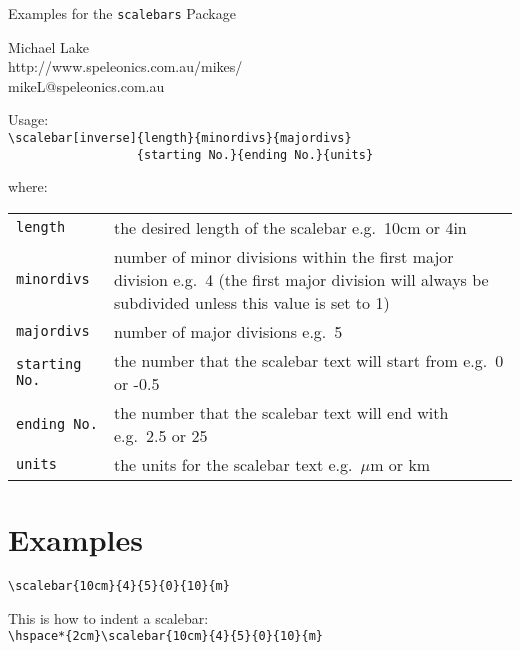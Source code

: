 \documentclass[a4paper,12pt]{article}
\begin{document}
\thispagestyle{empty}

\setlength{\parindent}{0pt}
\setlength{\parskip}{0.4\baselineskip}

{\huge \centering Examples for the \texttt{scalebars} Package

}
\vspace{2\baselineskip}

{\raggedleft Michael Lake\\
\small http://www.speleonics.com.au/mikes/\\
\makeatletter mikeL@speleonics.com.au \makeatother

}
\vspace{2\baselineskip}

Usage:\\
\verb+\scalebar[inverse]{length}{minordivs}{majordivs}+\\
\verb+                  {starting No.}{ending No.}{units}+

where:\\
\begin{tabularx}{\textwidth}{lX}
\texttt{length}    &the desired length of the scalebar e.g.\ 10cm or 4in\\
\texttt{minordivs} &number of minor divisions within the first major
           division e.g.\ 4 (the first major division will always be
           subdivided unless this value is set to 1)\\
\texttt{majordivs} &number of major divisions e.g.\ 5 \\
\texttt{starting No.}&the number that the scalebar text will start from 
                      e.g.\ 0 or -0.5\\
\texttt{ending No.}&the number that the scalebar text will end with 
                    e.g.\ 2.5 or 25\\
\texttt{units}&the units for the scalebar text e.g.\ $\mu$m or km
\end{tabularx}


\section*{Examples}


\verb+\scalebar{10cm}{4}{5}{0}{10}{m}+\\
\vspace{\baselineskip}


This is how to indent a scalebar:\\
\verb+\hspace*{2cm}\scalebar{10cm}{4}{5}{0}{10}{m}+\\
      \hspace*{2cm}
\vspace{\baselineskip}
\end{document}
